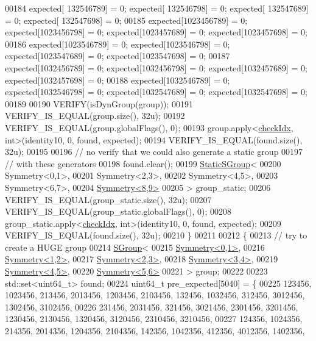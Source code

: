 \begin{DoxyCode}
00184     expected[ 132546789] = 0; expected[ 132546798] = 0; expected[ 132547689] = 0; expected[ 132547698] = 0;
00185     expected[1023456789] = 0; expected[1023456798] = 0; expected[1023457689] = 0; expected[1023457698] = 0;
00186     expected[1023546789] = 0; expected[1023546798] = 0; expected[1023547689] = 0; expected[1023547698] = 0;
00187     expected[1032456789] = 0; expected[1032456798] = 0; expected[1032457689] = 0; expected[1032457698] = 0;
00188     expected[1032546789] = 0; expected[1032546798] = 0; expected[1032547689] = 0; expected[1032547698] = 0;
00189 
00190     VERIFY(isDynGroup(group));
00191     VERIFY\_IS\_EQUAL(group.size(), 32u);
00192     VERIFY\_IS\_EQUAL(group.globalFlags(), 0);
00193     group.apply<\hyperlink{structcheck_idx}{checkIdx}, \textcolor{keywordtype}{int}>(identity10, 0, found, expected);
00194     VERIFY\_IS\_EQUAL(found.size(), 32u);
00195 
00196     \textcolor{comment}{// no verify that we could also generate a static group}
00197     \textcolor{comment}{// with these generators}
00198     found.clear();
00199     \hyperlink{class_eigen_1_1_static_s_group}{StaticSGroup}<
00200       Symmetry<0,1>,
00201       Symmetry<2,3>,
00202       Symmetry<4,5>,
00203       Symmetry<6,7>,
00204       \hyperlink{struct_eigen_1_1_symmetry}{Symmetry<8,9>}
00205     > group\_static;
00206     VERIFY\_IS\_EQUAL(group\_static.size(), 32u);
00207     VERIFY\_IS\_EQUAL(group\_static.globalFlags(), 0);
00208     group\_static.apply<\hyperlink{structcheck_idx}{checkIdx}, \textcolor{keywordtype}{int}>(identity10, 0, found, expected);
00209     VERIFY\_IS\_EQUAL(found.size(), 32u);
00210   \}
00211 
00212   \{
00213     \textcolor{comment}{// try to create a HUGE group}
00214     \hyperlink{class_eigen_1_1_s_group}{SGroup}<
00215       \hyperlink{struct_eigen_1_1_symmetry}{Symmetry<0,1>},
00216       \hyperlink{struct_eigen_1_1_symmetry}{Symmetry<1,2>},
00217       \hyperlink{struct_eigen_1_1_symmetry}{Symmetry<2,3>},
00218       \hyperlink{struct_eigen_1_1_symmetry}{Symmetry<3,4>},
00219       \hyperlink{struct_eigen_1_1_symmetry}{Symmetry<4,5>},
00220       \hyperlink{struct_eigen_1_1_symmetry}{Symmetry<5,6>}
00221     > group;
00222 
00223     std::set<uint64\_t> found;
00224     uint64\_t pre\_expected[5040] = \{
00225        123456, 1023456,  213456, 2013456, 1203456, 2103456,  132456, 1032456,  312456, 3012456, 1302456, 
      3102456,
00226        231456, 2031456,  321456, 3021456, 2301456, 3201456, 1230456, 2130456, 1320456, 3120456, 2310456, 
      3210456,
00227        124356, 1024356,  214356, 2014356, 1204356, 2104356,  142356, 1042356,  412356, 4012356, 1402356, 

\end{DoxyCode}
